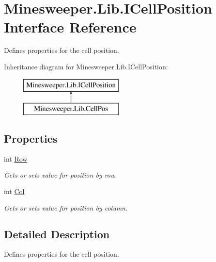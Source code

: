 \hypertarget{interface_minesweeper_1_1_lib_1_1_i_cell_position}{\section{Minesweeper.\+Lib.\+I\+Cell\+Position Interface Reference}
\label{interface_minesweeper_1_1_lib_1_1_i_cell_position}
}


Defines properties for the cell position.  


Inheritance diagram for Minesweeper.\+Lib.\+I\+Cell\+Position\+:\begin{figure}[H]
\begin{center}
\leavevmode
\includegraphics[height=2.000000cm]{interface_minesweeper_1_1_lib_1_1_i_cell_position}
\end{center}
\end{figure}
\subsection*{Properties}
\begin{DoxyCompactItemize}
\item 
int \hyperlink{interface_minesweeper_1_1_lib_1_1_i_cell_position_a41fc9d6cadddc3e5c66d01746f74f823}{Row}
\begin{DoxyCompactList}\small\item\em Gets or sets value for position by row. \end{DoxyCompactList}\item 
int \hyperlink{interface_minesweeper_1_1_lib_1_1_i_cell_position_aca8beb37824e81653e0b2425a2dd475e}{Col}
\begin{DoxyCompactList}\small\item\em Gets or sets value for position by column. \end{DoxyCompactList}\end{DoxyCompactItemize}


\subsection{Detailed Description}
Defines properties for the cell position. 



